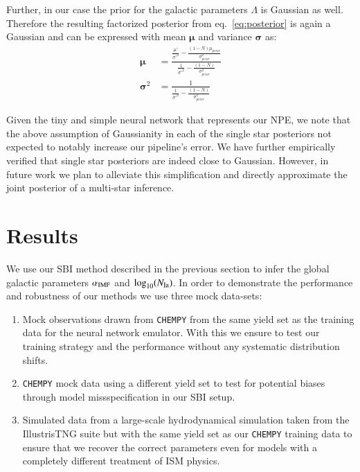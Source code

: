 \documentclass{aa}
\begin{document}
Further, in our case the prior for the galactic parameters $\Lambda$ is Gaussian as well. Therefore the resulting factorized posterior from eq.~\ref{eq:posterior} is again a Gaussian and can be expressed with mean $\mathbf{\mu}$ and variance $\mathbf{\sigma}$ as:
\begin{align}
\mathbf{\mu} &= \frac{\frac{\mu'}{\sigma'^2}-\frac{(1-N)\mu_ {prior}}{\sigma_ {prior}^2}}{\frac1{\sigma'^2}-\frac{(1-N)}{\sigma_ {prior}^2}} \\
\mathbf{\sigma}^2 &= \frac1 {\frac1{\sigma'^2}-\frac{(1-N)}{\sigma_ {prior}^2}}
\end{align}

Given the tiny and simple neural network that represents our NPE, we note that the above assumption of Gaussianity in each of the single star posteriors not expected to notably increase our pipeline's error. We have further empirically verified that single star posteriors are indeed close to Gaussian.
However, in future work we plan to alleviate this simplification and directly approximate the joint posterior of a multi-star inference.


\section{Results}
\label{sec: Results}

We use our SBI method described in the previous section to infer the global galactic parameters $\alpha_{\rm {IMF}}$ and $\log_{10}(N_{\rm{Ia}})$. In order to demonstrate the performance and robustness of our methods we use three mock data-sets: 
\begin{enumerate}
    \item Mock observations drawn from \texttt{CHEMPY} from the same yield set as the training data for the neural network emulator. With this we ensure to test our training strategy and the performance without any systematic distribution shifts. 
    \item  \texttt{CHEMPY} mock data using a different yield set to test for potential biases through model missspecification in our SBI setup.
    \item Simulated data from a large-scale hydrodynamical simulation taken from the IllustrisTNG suite \citep{Pillepich2018} but with the same yield set as our \texttt{CHEMPY} training data to ensure that we recover the correct parameters even for models with a completely different treatment of ISM physics.
\end{enumerate}
\end{document}
